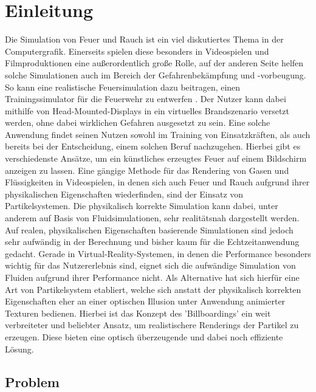 \section{Einleitung}
\noindent

Die Simulation von Feuer und Rauch ist ein viel diskutiertes Thema in der Computergrafik. Einerseits
spielen diese besonders in Videospielen und Filmproduktionen eine außerordentlich große Rolle, auf der
anderen Seite helfen solche Simulationen auch im Bereich der Gefahrenbekämpfung und -vorbeugung.
So kann eine realistische Feuersimulation dazu beitragen, einen Trainingssimulator für die Feuerwehr zu
entwerfen \parencite{Schlager2017}. Der Nutzer kann dabei mithilfe von Head-Mounted-Displays in ein virtuelles Brandszenario versetzt werden,
ohne dabei wirklichen Gefahren ausgesetzt zu sein. Eine solche Anwendung findet seinen Nutzen sowohl im Training
von Einsatzkräften, als auch bereits bei der Entscheidung, einem solchen Beruf nachzugehen.
Hierbei gibt es verschiedenste Ansätze, um ein künstliches erzeugtes Feuer auf einem
Bildschirm anzeigen zu lassen. Eine gängige Methode für das Rendering von Gasen und Flüssigkeiten
in Videospielen, in denen sich auch Feuer und Rauch aufgrund ihrer physikalischen Eigenschaften
wiederfinden, sind der Einsatz von Partikelsystemen. Die physikalisch korrekte Simulation kann dabei,
unter anderem auf Basis von Fluidsimulationen, sehr realitätsnah dargestellt werden.
Auf realen, physikalischen Eigenschaften basierende Simulationen sind jedoch sehr aufwändig in der
Berechnung und bisher kaum für die Echtzeitanwendung gedacht.
Gerade in Virtual-Reality-Systemen, in denen die Performance besonders wichtig für das Nutzererlebnis sind,
eignet sich die aufwändige Simulation von Fluiden aufgrund ihrer Performance nicht. Als Alternative hat
sich hierfür eine Art von Partikelsystem etabliert, welche sich anstatt der physikalisch korrekten
Eigenschaften eher an einer optischen Illusion unter Anwendung animierter Texturen bedienen.
Hierbei ist das Konzept des 'Billboardings' ein weit verbreiteter und beliebter Ansatz,
um realistischere Renderings der Partikel zu erzeugen. Diese bieten eine optisch überzeugende und
dabei noch effiziente Lösung.



\subsection{Problem}


